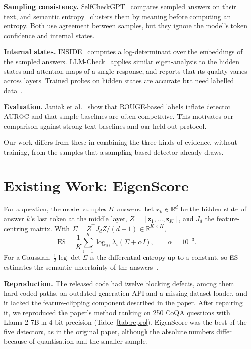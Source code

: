 \documentclass[journal]{IEEEtran}
\begin{document}
\textbf{Sampling consistency.} SelfCheckGPT~\cite{manakul2023} compares sampled answers on their text, and semantic entropy~\cite{farquhar2024} clusters them by meaning before computing an entropy. Both use agreement between samples, but they ignore the model's token confidence and internal states.

\textbf{Internal states.} INSIDE~\cite{chen2024inside} computes a log-determinant over the embeddings of the sampled answers. LLM-Check~\cite{sriramanan2024} applies similar eigen-analysis to the hidden states and attention maps of a single response, and reports that its quality varies across layers. Trained probes on hidden states are accurate but need labelled data~\cite{zhang2025icr}.

\textbf{Evaluation.} Janiak et al.~\cite{janiak2025} show that ROUGE-based labels inflate detector AUROC and that simple baselines are often competitive. This motivates our comparison against strong text baselines and our held-out protocol.

Our work differs from these in combining the three kinds of evidence, without training, from the samples that a sampling-based detector already draws.

\section{Existing Work: EigenScore}
For a question, the model samples $K$ answers. Let $\mathbf{z}_k\in\mathbb{R}^d$ be the hidden state of answer $k$'s last token at the middle layer, $Z=[\mathbf{z}_1,\dots,\mathbf{z}_K]$, and $J_d$ the feature-centring matrix. With $\Sigma = Z^\top J_d Z/(d-1)\in\mathbb{R}^{K\times K}$,
\begin{equation}
\mathrm{ES}=\frac{1}{K}\sum_{i=1}^{K}\log_{10}\lambda_i\!\left(\Sigma+\alpha I\right),\qquad \alpha=10^{-3}.
\end{equation}
For a Gaussian, $\tfrac12\log\det\Sigma$ is the differential entropy up to a constant, so ES estimates the semantic uncertainty of the answers~\cite{chen2024inside}.

\textbf{Reproduction.} The released code had twelve blocking defects, among them hard-coded paths, an outdated generation API and a missing dataset loader, and it lacked the feature-clipping component described in the paper. After repairing it, we reproduced the paper's method ranking on 250 CoQA questions with Llama-2-7B in 4-bit precision (Table~\ref{tab:repro}). EigenScore was the best of the five detectors, as in the original paper, although the absolute numbers differ because of quantisation and the smaller sample.
\end{document}
